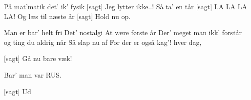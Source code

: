 \documentclass[a4paper,11pt]{article}
\begin{document}
\begin{song}
 På mat'matik
det' ik' fysik%
[sagt] Jeg lytter ikke..!
 Så ta' en tår
[sagt]  LA LA LA LA!
  Og læs til næste år
[sagt] Hold nu op.

 Man er bar' helt fri
   Det' nostalgi
   At være første år
   Der' meget man ikk' forstår
   og ting du aldrig når
   Så slap nu af
   For der er også kag'!
   hver dag, 

[sagt] Gå nu bare væk!

 Bar' man var RUS.

[sagt] Ud

\end{song}
\end{document}

